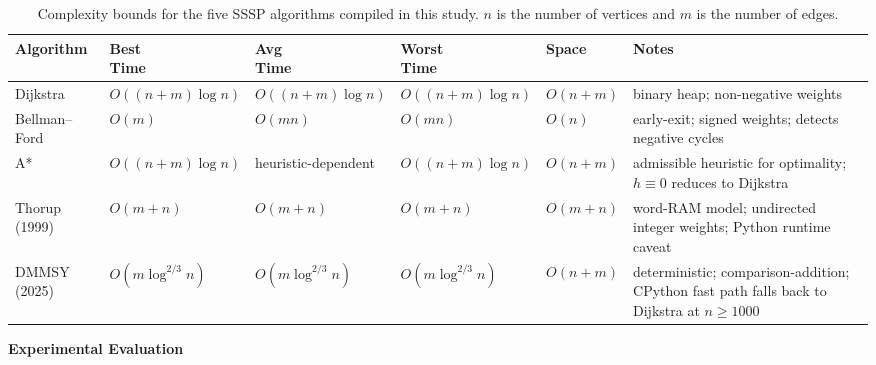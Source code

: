 \documentclass[12pt]{article}
\begin{document}
\begin{table}[H]
\centering
\caption{Complexity bounds for the five SSSP algorithms compiled in this study. $n$ is the number of vertices and $m$ is the number of edges.}
\label{tab:complexity}
{\footnotesize
\singlespacing
\setlength{\tabcolsep}{3pt}
\renewcommand{\arraystretch}{1.18}
\begin{tabularx}{\textwidth}{@{}p{2.2cm}>{\centering\arraybackslash}p{2.1cm}>{\centering\arraybackslash}p{2.0cm}>{\centering\arraybackslash}p{2.1cm}>{\centering\arraybackslash}p{1.3cm}>{\raggedright\arraybackslash}X@{}}
\toprule
\textbf{Algorithm} & \makecell{\textbf{Best}\\\textbf{Time}} & \makecell{\textbf{Avg}\\\textbf{Time}} & \makecell{\textbf{Worst}\\\textbf{Time}} & \textbf{Space} & \textbf{Notes} \\
\midrule
Dijkstra        & $O((n+m)\log n)$ & $O((n+m)\log n)$ & $O((n+m)\log n)$ & $O(n+m)$ & binary heap; non-negative weights \\
Bellman--Ford   & $O(m)$           & $O(mn)$          & $O(mn)$          & $O(n)$   & early-exit; signed weights; detects negative cycles \\
A*              & $O((n+m)\log n)$ & heuristic-dependent & $O((n+m)\log n)$ & $O(n+m)$ & admissible heuristic for optimality; $h \equiv 0$ reduces to Dijkstra \\
Thorup (1999)   & $O(m+n)$         & $O(m+n)$         & $O(m+n)$         & $O(m+n)$ & word-RAM model; undirected integer weights; Python runtime caveat \\
DMMSY (2025)    & $O(m \log^{2/3} n)$ & $O(m \log^{2/3} n)$ & $O(m \log^{2/3} n)$ & $O(n+m)$ & deterministic; comparison-addition; CPython fast path falls back to Dijkstra at $n \ge 1000$ \\
\bottomrule
\end{tabularx}
\par}
\end{table}

\newpage
\noindent\textbf{Experimental Evaluation}\label{sec:experimental-evaluation}
\medskip
\end{document}
